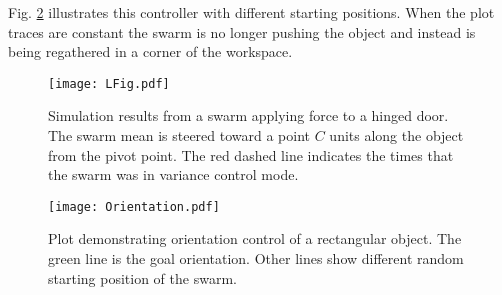 %

Fig. \ref{fig:OrientCont} illustrates this controller with different starting positions. When the plot traces are constant the swarm is no longer pushing the object and instead is being regathered in a corner of the workspace.%




\begin{figure}
\begin{center}
	\texttt{[image: LFig.pdf]}
\end{center}
\vspace{-1em}
\caption{\label{fig:LFig}
Simulation results from a swarm applying force to a hinged door. 
The swarm mean is steered toward a point $C$ units along the object from the pivot point. The red dashed line indicates the times that the swarm was in variance control mode.
}
\vspace{-1em}
\end{figure}





\begin{figure}
\begin{center}
	\texttt{[image: Orientation.pdf]}
\end{center}
\vspace{-1em}
\caption{\label{fig:OrientCont}
Plot demonstrating  orientation control of a rectangular object. The green line is the goal orientation. Other lines show different random starting position of the swarm.%
}
\vspace{-1em}
\end{figure}




